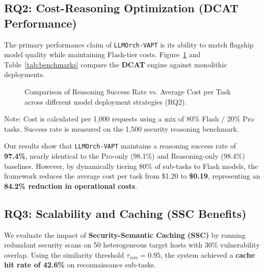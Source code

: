 

\subsection{RQ2: Cost-Reasoning Optimization (DCAT Performance)}
The primary performance claim of \texttt{LLMOrch-VAPT} is its ability to match flagship model quality while maintaining Flash-tier costs. Figure~\ref{fig:eval_metrics} and Table~\ref{tab:benchmarks} compare the \textbf{DCAT} engine against monolithic deployments.

\begin{figure}[!t]
    \centering
    \resizebox{0.85\columnwidth}{!}{
        
    }
    \caption{Comparison of Reasoning Success Rate vs. Average Cost per Task across different model deployment strategies (RQ2).}
    \label{fig:eval_metrics}
\end{figure}

\begin{table}[!t]
    \centering
    \caption{LLM Provider Performance Benchmarks for Security Reasoning}
    \label{tab:benchmarks}
    \resizebox{\columnwidth}{!}{
        
    }
    \vspace{1mm}
    \footnotesize{Note: Cost is calculated per 1,000 requests using a mix of 80\% Flash / 20\% Pro tasks. Success rate is measured on the 1,500 security reasoning benchmark.}
\end{table}

Our results show that \texttt{LLMOrch-VAPT} maintains a reasoning success rate of \textbf{97.4\%}, nearly identical to the Pro-only (98.1\%) and Reasoning-only (98.4\%) baselines. However, by dynamically tiering 80\% of sub-tasks to Flash models, the framework reduces the average cost per task from \$1.20 to \textbf{\$0.19}, representing an \textbf{84.2\% reduction in operational costs}.

\subsection{RQ3: Scalability and Caching (SSC Benefits)}
We evaluate the impact of \textbf{Security-Semantic Caching (SSC)} by running redundant security scans on 50 heterogeneous target hosts with 30\% vulnerability overlap. Using the similarity threshold $\tau_{sim} = 0.95$, the system achieved a \textbf{cache hit rate of 42.6\%} on reconnaissance sub-tasks.

